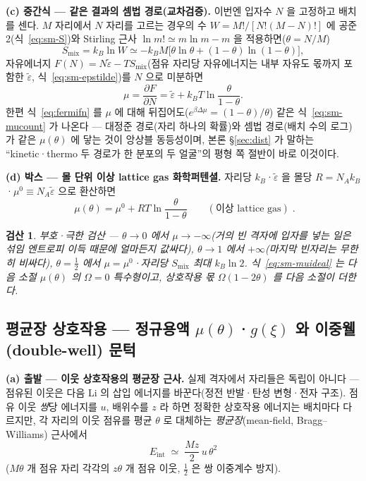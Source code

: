\documentclass[11pt,a4paper]{article}
\newtheorem*{verifybox}{검산}
\begin{document}
\textbf{(c) 중간식 --- 같은 결과의 셈법 경로(교차검증).} 이번엔 입자수 $N$ 을 고정하고 배치를 센다.
$M$ 자리에서 $N$ 자리를 고르는 경우의 수 $W=M!/[N!(M-N)!]$ 에 공준 2(식~\eqref{eq:sm-S})와 Stirling 근사
$\ln m!\simeq m\ln m-m$ 을 적용하면($\theta=N/M$)
\begin{equation}
S_\mathrm{mix}=k_B\ln W\simeq-k_BM\big[\theta\ln\theta+(1-\theta)\ln(1-\theta)\big],
\label{eq:sm-Smix}
\end{equation}
자유에너지 $F(N)=N\tilde\varepsilon-TS_\mathrm{mix}$(점유 자리당 자유에너지는 내부 자유도 몫까지 포함한
$\tilde\varepsilon$, 식~\eqref{eq:sm-epstilde})를 $N$ 으로 미분하면
\begin{equation}
\mu=\frac{\partial F}{\partial N}
=\tilde\varepsilon+k_BT\ln\frac{\theta}{1-\theta}.
\label{eq:sm-mucount}
\end{equation}
한편 식~\eqref{eq:fermifn} 를 $\mu$ 에 대해 뒤집어도($e^{\beta\Delta\mu}=(1-\theta)/\theta$) 같은
식~\eqref{eq:sm-mucount} 가 나온다 --- 대정준 경로(자리 하나의 확률)와 셈법 경로(배치 수의 로그)가 같은
$\mu(\theta)$ 에 닿는 것이 앙상블 동등성이며, 본론 \S\ref{sec:dist} 가 말하는 ``kinetic·thermo 두 경로가 한
분포의 두 얼굴''의 평형 쪽 절반이 바로 이것이다.

\textbf{(d) 박스 --- 몰 단위 이상 lattice gas 화학퍼텐셜.} 자리당 $k_B$·$\tilde\varepsilon$ 을 몰당
$R=N_Ak_B$·$\mu^0\equiv N_A\tilde\varepsilon$ 으로 환산하면
\begin{equation}
\boxed{\;\mu(\theta)=\mu^0+RT\ln\frac{\theta}{1-\theta}\qquad(\text{이상 lattice gas})\;.}
\label{eq:sm-muideal}
\end{equation}
\begin{verifybox}
부호·극한 검산 --- $\theta\to0$ 에서 $\mu\to-\infty$(거의 빈 격자에 입자를 넣는 일은 섞임 엔트로피 이득 때문에
얼마든지 값싸다), $\theta\to1$ 에서 $+\infty$(마지막 빈자리는 무한히 비싸다), $\theta=\tfrac12$ 에서
$\mu=\mu^0$·자리당 $S_\mathrm{mix}$ 최대 $k_B\ln2$. 식~\eqref{eq:sm-muideal} 는 다음 소절 $\mu(\theta)$ 의
$\Omega=0$ 특수형이고, 상호작용 몫 $\Omega(1-2\theta)$ 를 다음 소절이 더한다.
\end{verifybox}
\subsection{평균장 상호작용 --- 정규용액 $\mu(\theta)$·$g(\xi)$ 와 이중웰(double-well) 문턱}\label{sec:sm-mf}
\textbf{(a) 출발 --- 이웃 상호작용의 평균장 근사.} 실제 격자에서 자리들은 독립이 아니다 --- 점유된 이웃은 다음
Li 의 삽입 에너지를 바꾼다(정전 반발·탄성 변형·전자 구조). 점유 이웃 \emph{쌍}당 에너지를 $u$, 배위수를 $z$
라 하면 정확한 상호작용 에너지는 배치마다 다르지만, 각 자리의 이웃 점유를 평균 $\theta$ 로 대체하는
\emph{평균장}(mean-field, Bragg--Williams) 근사에서
\begin{equation}
E_\mathrm{int}\;\simeq\;\frac{Mz}{2}\,u\,\theta^2
\label{eq:sm-mf}
\end{equation}
($M\theta$ 개 점유 자리 각각의 $z\theta$ 개 점유 이웃, $\tfrac12$ 은 쌍 이중계수 방지).
\end{document}
